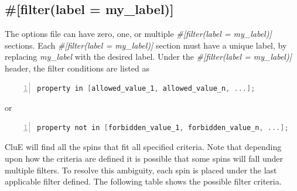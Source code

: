 \documentclass{book}
\begin{document}
\subsection{\#[filter(label = my\_label)]}
The options file can have zero, one, or multiple 
\textit{\#[filter(label = my\_label)]} sections.  
Each \textit{\#[filter(label = my\_label)]} section must have a unique label,
by replacing \textit{my\_label} with the desired label. 
Under the \textit{\#[filter(label = my\_label)]} header, the filter conditions
are listed as
\begin{lstlisting}[frame=single,numbers=left,language=c]
property in [allowed_value_1, allowed_value_n, ...];
\end{lstlisting}
or
\begin{lstlisting}[frame=single,numbers=left,language=c]
property not in [forbidden_value_1, forbidden_value_n, ...];
\end{lstlisting}
CluE will find all the spins that fit all specified criteria.
Note that depending upon how the criteria are defined it is possible that
some spins will fall under multiple filters.  
To resolve this ambiguity, each spin is placed under the
last applicable filter defined.  
The following table shows the possible filter criteria.
\end{document}
